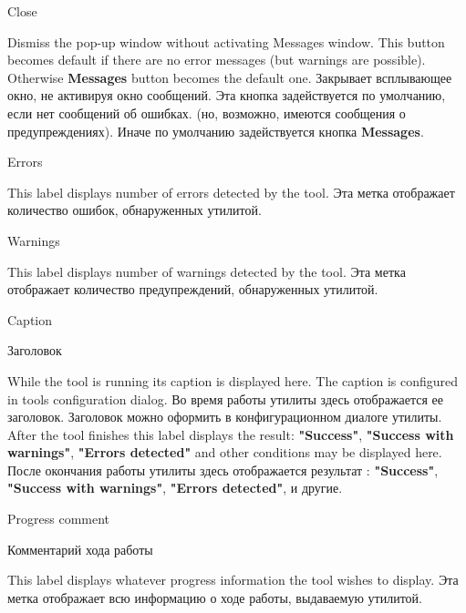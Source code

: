 \begin{popup}
\caption{Close}

\ifenglish
Dismiss the pop-up window without activating Messages window.
This button becomes default if there are no error messages (but warnings
are possible). Otherwise {\bf Messages} button becomes the default one.
\else
Закрывает всплывающее окно, не активируя окно сообщений.
Эта кнопка задействуется по умолчанию, если нет сообщений об ошибках.
(но, возможно, имеются сообщения о предупреждениях).
Иначе по умолчанию задействуется кнопка {\bf Messages}.
\fi
\end{popup}

\begin{popup}
\caption{Errors}
\ifenglish
This label displays number of errors detected by the tool.
\else
Эта метка отображает количество ошибок, обнаруженных утилитой.
\fi
\end{popup}

\begin{popup}
\caption{Warnings}
\ifenglish
This label displays number of warnings detected by the tool.
\else
Эта метка отображает количество предупреждений, обнаруженных утилитой.
\fi
\end{popup}



\begin{popup}
\ifenglish
\caption{Caption}
\else
\caption{Заголовок}
\fi
{}

\ifenglish
While the tool is running its caption is displayed here. The caption is configured
in tools configuration dialog.
\else
Во время работы утилиты здесь отображается ее заголовок. Заголовок можно 
оформить в конфигурационном диалоге утилиты.
\fi
\ifenglish
After the tool finishes this label displays the result: {\bf "Success"},
{\bf "Success with warnings"}, {\bf "Errors detected"} and other conditions
may be displayed here.
\else
После окончания работы утилиты здесь отображается результат : {\bf "Success"},
{\bf "Success with warnings"}, {\bf "Errors detected"}, и другие.
\fi
\end{popup}

\begin{popup}
\ifenglish
\caption{Progress comment}
\else
\caption{Комментарий хода работы}
\fi
{}

\ifenglish
This label displays whatever progress information the tool wishes to display.
\else
Эта метка отображает всю информацию о ходе работы, выдаваемую утилитой.
\fi
\end{popup}


